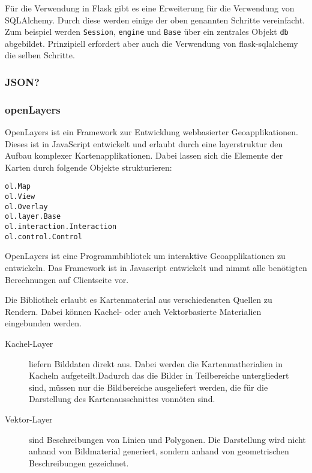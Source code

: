    
    Für die Verwendung in Flask gibt es eine Erweiterung für die Verwendung von SQLAlchemy. Durch diese werden einige der oben genannten Schritte vereinfacht. Zum beispiel werden \texttt{Session}, \texttt{engine} und \texttt{Base} über ein zentrales Objekt \texttt{db} abgebildet. Prinzipiell erfordert aber auch die Verwendung von flask-sqlalchemy die selben Schritte.
    
    
    \subsubsection{JSON?}

    \subsubsection{openLayers}
    
    OpenLayers ist ein Framework zur Entwicklung webbasierter Geoapplikationen. Dieses ist in JavaScript entwickelt und erlaubt durch eine layerstruktur den Aufbau komplexer Kartenapplikationen. Dabei lassen sich die Elemente der Karten durch folgende Objekte strukturieren:
    
    \begin{description}
     \item [\texttt{ol.Map}]  
     \item [\texttt{ol.View}] 
     \item [\texttt{ol.Overlay}]
     \item [\texttt{ol.layer.Base}]
     \item [\texttt{ol.interaction.Interaction}]
     \item [\texttt{ol.control.Control}]
    \end{description}

    
    OpenLayers ist eine Programmbibliotek um interaktive Geoapplikationen zu entwickeln. Das Framework ist in Javascript entwickelt und nimmt alle benötigten Berechnungen auf Clientseite vor.
    
    Die Bibliothek erlaubt es Kartenmaterial aus verschiedensten Quellen zu Rendern. Dabei können Kachel- oder auch Vektorbasierte Materialien eingebunden werden.
    
    \begin{description}
     \item [Kachel-Layer]  liefern Bilddaten direkt aus. Dabei werden die Kartenmatherialien in Kacheln aufgeteilt.Dadurch das die Bilder in Teilbereiche untergliedert sind, müssen nur die Bildbereiche ausgeliefert werden, die für die Darstellung des Kartenausschnittes vonnöten sind.
     
     \item [Vektor-Layer] sind Beschreibungen von Linien und Polygonen. Die Darstellung wird nicht anhand von Bildmaterial generiert, sondern anhand von geometrischen Beschreibungen gezeichnet. 
    \end{description}
    

